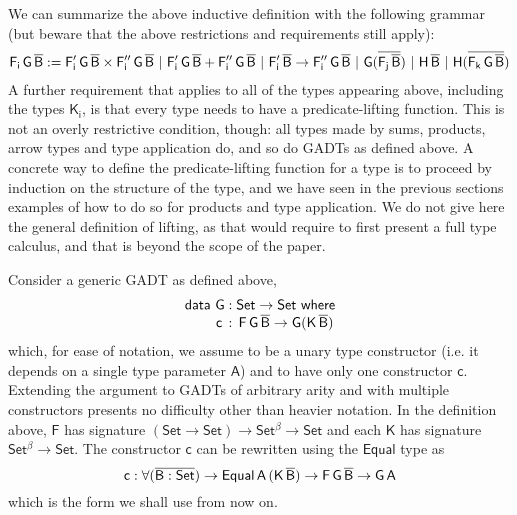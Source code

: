 \documentclass[9pt]{entcs}
\begin{document}
We can summarize the above inductive definition with the following grammar
(but beware that the above restrictions and requirements still apply):
\[
\mathsf{F_i\,G\,\overline{B} :=
F_i'\,G\,\overline{B} \times F_i''\,G\,\overline{B}
\ \vert\ F_i'\,G\,\overline{B} + F_i''\,G\,\overline{B}
\ \vert\ F_i'\,\overline{B} \to F_i''\,G\,\overline{B}
\ \vert\ G(\overline{F_j\,\overline{B}})
\ \vert\ H\,\overline{B}
\ \vert\ H (\overline{F_k\,G\,\overline{B}})
}
\]
A further requirement that applies to all of the types appearing above,
including the types $\mathsf{K_i}$,
is that every type needs to have a predicate-lifting function.
This is not an overly restrictive condition, though:
all types made by sums, products, arrow types and type application do, and so do GADTs as defined above.
A concrete way to define the predicate-lifting function for a type is to proceed by induction on the structure of the type,
and we have seen in the previous sections examples of how to do so for products and type application.
We do not give here the general definition of lifting,
as that would require to first present a full type calculus,
and that is beyond the scope of the paper.


Consider a generic GADT as defined above,
\begin{equation}\label{eq:gadt}
\begin{array}{l}
\mathsf{data\ G : Set \to Set\ where}\\
\mathsf{\;\;\;\;\;\;\;\;c\, :\, F\,G\,\overline{B} \to G (K\,\overline{B})}
\end{array}
\end{equation}
which, for ease of notation,
we assume to be a unary type constructor (i.e. it depends on a single type parameter $\mathsf{A}$)
and to have only one constructor $\mathsf{c}$.
Extending the argument to GADTs of arbitrary arity and with multiple constructors presents no difficulty
other than heavier notation.
In the definition above, $\mathsf{F}$ has signature $\mathsf{(Set \to Set) \to Set^{\beta} \to Set}$
and each $\mathsf{K}$ has signature $\mathsf{Set^{\beta} \to Set}$.
The constructor $\mathsf{c}$ can be rewritten using the $\mathsf{Equal}$ type as
\[
\mathsf{c : \forall (\overline{B : Set}) \to Equal\,A\,(K\,\overline{B}) \to F\,G\,\overline{B} \to G\,A}
\]
which is the form we shall use from now on.
\end{document}
